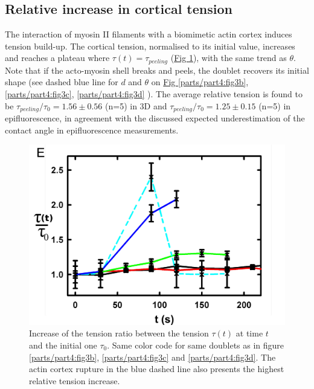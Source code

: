 \documentclass[A4paperpaper,11pt,english]{sphinxmanual}
\begin{document}
\subsection{Relative increase in cortical tension}
\label{parts/part4:relative-increase-in-cortical-tension}
The interaction of myosin II filaments with a biomimetic actin cortex induces
tension build-up. The cortical tension, normalised to its initial value,
increases and reaches a plateau where \(\tau(t) = \tau_{peeling}\)
(\hyperref[parts/part4:fig3e]{Fig  \ref*{parts/part4:fig3e}}), with the same trend as \(\theta\).  Note that if the acto-myosin shell
breaks and peels, the doublet recovers its initial shape (see dashed blue line
for \(d\) and \(\theta\) on  \hyperref[parts/part4:fig3b]{Fig  \ref*{parts/part4:fig3b}}, \hyperref[parts/part4:fig3c]{ \ref*{parts/part4:fig3c}}, \hyperref[parts/part4:fig3d]{ \ref*{parts/part4:fig3d}} ). The average relative tension is found to
be \(\tau_{peeling}/\tau_0 = 1.56 \pm 0.56\) (n=5) in 3D and
\(\tau_{peeling}/\tau_0  = 1.25 \pm 0.15\) (n=5) in epifluorescence, in
agreement with the discussed expected underestimation of the contact angle in epifluorescence measurements.
\begin{figure}[htbp]
\centering
\capstart

\includegraphics[width=0.500\linewidth]{Fig_03-E.png}
\caption{Increase of the tension ratio between the tension \(\tau(t)\) at time
\(t\) and the initial one \(\tau_0\).
Same color code for same doublets as in figure \hyperref[parts/part4:fig3b]{ \ref*{parts/part4:fig3b}}, \hyperref[parts/part4:fig3c]{ \ref*{parts/part4:fig3c}}
and \hyperref[parts/part4:fig3d]{ \ref*{parts/part4:fig3d}}. The actin cortex rupture in the blue dashed line also presents the highest relative tension increase.}\label{parts/part4:fig3e}\end{figure}
\end{document}
